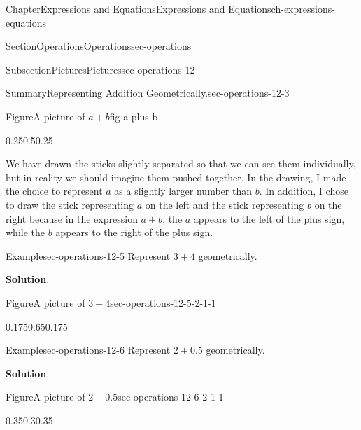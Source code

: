 \documentclass[twoside,11pt,]{book}
\newcommand{\blocktitlefont}{\relax}
\numberwithin{equation}{chapter}
\begin{document}
\begin{chapterptx}{Chapter}{Expressions and Equations}{}{Expressions and Equations}{}{}{ch-expressions-equations}
\begin{sectionptx}{Section}{Operations}{}{Operations}{}{}{sec-operations}
\begin{subsectionptx}{Subsection}{Pictures}{}{Pictures}{}{}{sec-operations-12}
\begin{assemblage}{Summary}{Representing Addition Geometrically.}{sec-operations-12-3}
\begin{figureptx}{Figure}{A picture of \(a+b\)}{fig-a-plus-b}{}
\begin{image}{0.25}{0.5}{0.25}{}
{%
}%
\end{image}%
\tcblower
\end{figureptx}%
%
\end{assemblage}
We have drawn the sticks slightly separated so that we can see them individually, but in reality we should imagine them pushed together. In the drawing, I made the choice to represent \(a\) as a slightly larger number than \(b\). In addition, I chose to draw the stick representing \(a\) on the left and the stick representing \(b\) on the right because in the expression \(a+b\), the \(a\) appears to the left of the plus sign, while the \(b\) appears to the right of the plus sign.%
\begin{example}{Example}{}{sec-operations-12-5}%
Represent \(3+4\) geometrically.%
\par\smallskip%
\noindent\textbf{\blocktitlefont Solution}.\hypertarget{sec-operations-12-5-2}{}\quad{}\begin{figureptx}{Figure}{A picture of \(3+4\)}{sec-operations-12-5-2-1-1}{}%
\begin{image}{0.175}{0.65}{0.175}{}%
%
\end{image}%
\tcblower
\end{figureptx}%
%
\end{example}
\begin{example}{Example}{}{sec-operations-12-6}%
Represent \(2+0.5\) geometrically.%
\par\smallskip%
\noindent\textbf{\blocktitlefont Solution}.\hypertarget{sec-operations-12-6-2}{}\quad{}\begin{figureptx}{Figure}{A picture of \(2+0.5\)}{sec-operations-12-6-2-1-1}{}%
\begin{image}{0.35}{0.3}{0.35}{}%
\end{image}
\end{figureptx}
\end{example}
\end{subsectionptx}
\end{sectionptx}
\end{chapterptx}
\end{document}
